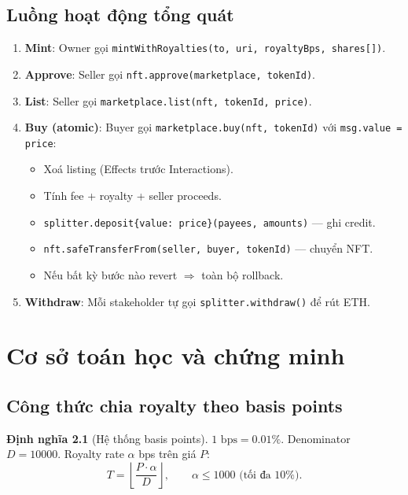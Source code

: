 \documentclass[12pt,a4paper,oneside]{report}
\theoremstyle{plain}
\theoremstyle{definition}
\newtheorem{definition}[theorem]{Định nghĩa}
\theoremstyle{remark}
\begin{document}
\section{Luồng hoạt động tổng quát}
\begin{enumerate}
  \item \textbf{Mint}: Owner gọi \texttt{mintWithRoyalties(to, uri, royaltyBps, shares[])}.
  \item \textbf{Approve}: Seller gọi \texttt{nft.approve(marketplace, tokenId)}.
  \item \textbf{List}: Seller gọi \texttt{marketplace.list(nft, tokenId, price)}.
  \item \textbf{Buy (atomic)}: Buyer gọi \texttt{marketplace.buy(nft, tokenId)} với \texttt{msg.value = price}:
    \begin{itemize}
      \item Xoá listing (Effects trước Interactions).
      \item Tính fee + royalty + seller proceeds.
      \item \texttt{splitter.deposit\{value: price\}(payees, amounts)} — ghi credit.
      \item \texttt{nft.safeTransferFrom(seller, buyer, tokenId)} — chuyển NFT.
      \item Nếu bất kỳ bước nào revert $\Rightarrow$ toàn bộ rollback.
    \end{itemize}
  \item \textbf{Withdraw}: Mỗi stakeholder tự gọi \texttt{splitter.withdraw()} để rút ETH.
\end{enumerate}

\chapter{Cơ sở toán học và chứng minh}
\label{chap:math}

\section{Công thức chia royalty theo basis points}

\begin{definition}[Hệ thống basis points]
$1\text{ bps} = 0.01\%$. Denominator $D = 10000$. Royalty rate $\alpha$ bps trên giá $P$:
\[
  T = \left\lfloor \frac{P \cdot \alpha}{D} \right\rfloor, \qquad \alpha \le 1000 \text{ (tối đa 10\%)}.
\]
\end{definition}
\end{document}
